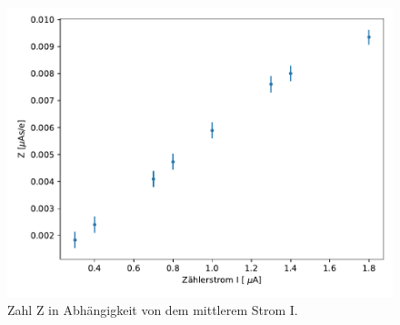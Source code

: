 \begin{figure}
  \centering
  \includegraphics[width=\textwidth]{Aufgabe_Bestimmung_des_Zaehlrohrstroms.pdf}
  \caption{Zahl Z in Abhängigkeit von dem mittlerem Strom I.}
  \label{fig:I_Z}
\end{figure}


